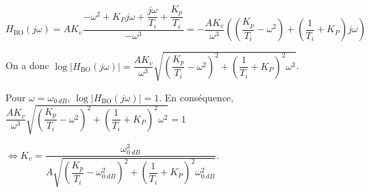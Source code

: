 \ifprof
\begin{corrige}
$H_{\text{BO}}(j\omega)=AK_v\dfrac{-\omega^2 + K_Pj\omega + \dfrac{j\omega}{T_i}+\dfrac{K_p}{T_i }}{-\omega^3}
=-\dfrac{AK_v}{\omega^3}  \left(\left(\dfrac{K_p}{T_i }-\omega^2 \right)+\left(\dfrac{1}{T_i}+ K_P\right)j\omega \right)$

On a donc 
$\log\left|H_{\text{BO}}(j\omega)\right|=\dfrac{AK_v}{\omega^3}  \sqrt{\left(\dfrac{K_p}{T_i }-\omega^2 \right)^2+\left(\dfrac{1}{T_i}+ K_P\right)^2\omega^2}$. 

Pour $\omega=\omega_{\SI{0}{dB}}$, $\log\left|H_{\text{BO}}(j\omega)\right|=1$. En conséquence, 
$\dfrac{AK_v}{\omega^3}  \sqrt{\left(\dfrac{K_p}{T_i }-\omega^2 \right)^2+\left(\dfrac{1}{T_i}+ K_P\right)^2\omega^2}=1 $

$\Leftrightarrow 
K_v  =\dfrac{\omega_{\SI{0}{dB}}^3}{A\sqrt{\left(\dfrac{K_p}{T_i }-\omega_{\SI{0}{dB}}^2 \right)^2+\left(\dfrac{1}{T_i}+ K_P\right)^2\omega_{\SI{0}{dB}}^2}}$.
\end{corrige}
\else
\fi


